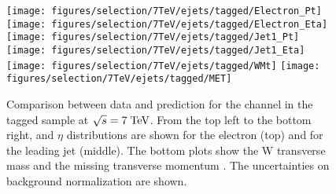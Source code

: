 %                                      
\begin{figure}
\centering
\texttt{[image: figures/selection/7TeV/ejets/tagged/Electron\_Pt]}
\texttt{[image: figures/selection/7TeV/ejets/tagged/Electron\_Eta]}
\texttt{[image: figures/selection/7TeV/ejets/tagged/Jet1\_Pt]}
\texttt{[image: figures/selection/7TeV/ejets/tagged/Jet1\_Eta]}
\texttt{[image: figures/selection/7TeV/ejets/tagged/WMt]}
\texttt{[image: figures/selection/7TeV/ejets/tagged/MET]}
\caption{Comparison between data and prediction for the \ejets{} channel in the tagged
  sample at $\sqrt{s} = 7 \; \mathrm{TeV}{}$.  From the top left to the bottom
  right, \pt{} and $\eta$ distributions are shown for the
  electron (top) and for the leading jet (middle). The bottom plots
  show the W transverse mass \mtw{} and the missing transverse
  momentum \met{}. The uncertainties on background normalization are shown.}
\label{fig:2011ele_tagged}
\end{figure}


